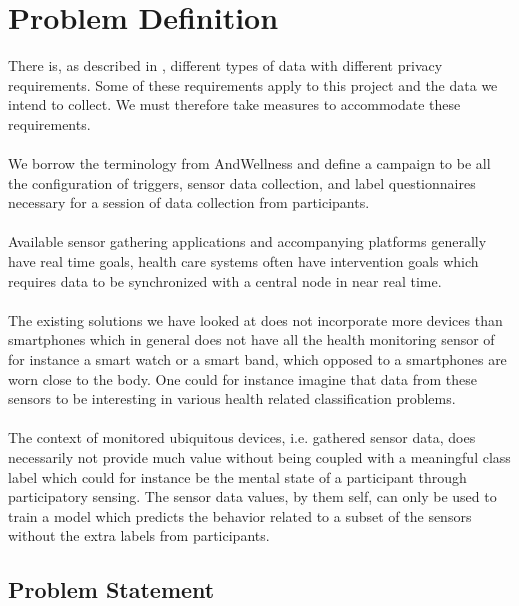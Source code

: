 
\section{Problem Definition} 
\label{sec:problem_definition}
There is, as described in , different types of data with different privacy requirements. Some of these requirements apply to this project and the data we intend to collect. We must therefore take measures to accommodate these requirements. 
\\\\
We borrow the terminology from AndWellness \parencite{hicks2010andwellness} and define a campaign to be all the configuration of triggers, sensor data collection, and label questionnaires necessary for a session of data collection from participants.    
\\\\
Available sensor gathering applications and accompanying platforms generally have real time goals, health care systems often have intervention goals which requires data to be synchronized with a central node in near real time. 
\\\\
The existing solutions we have looked at does not incorporate more devices than smartphones which in general does not have all the health monitoring sensor of for instance a smart watch or a smart band, which opposed to a smartphones are worn close to the body. One could for instance imagine that data from these sensors to be interesting in various health related classification problems. 
\\\\
The context of monitored ubiquitous devices, i.e. gathered sensor data, does necessarily not provide much value without being coupled with a meaningful class label which could for instance be the mental state of a participant through participatory sensing. The sensor data values, by them self, can only be used to train a model which predicts the behavior related to a subset of the sensors without the extra labels from participants. 

\subsection{Problem Statement}
\label{sub:problem_statement}

